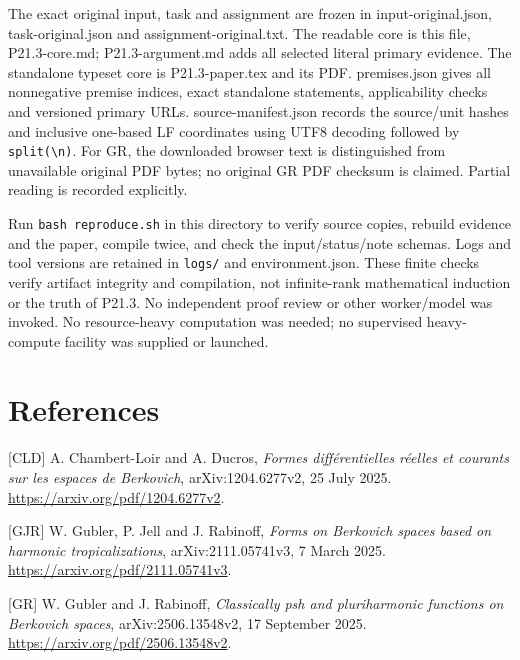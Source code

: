 \documentclass[
  11pt,
]{article}
\begin{document}
The exact original input, task and assignment are frozen in
input-original.json, task-original.json and assignment-original.txt. The
readable core is this file, P21.3-core.md; P21.3-argument.md adds all
selected literal primary evidence. The standalone typeset core is
P21.3-paper.tex and its PDF. premises.json gives all nonnegative premise
indices, exact standalone statements, applicability checks and versioned
primary URLs. source-manifest.json records the source/unit hashes and
inclusive one-based LF coordinates using UTF8 decoding followed by
\texttt{split(\textquotesingle{}\textbackslash{}n\textquotesingle{})}.
For GR, the downloaded browser text is distinguished from unavailable
original PDF bytes; no original GR PDF checksum is claimed. Partial
reading is recorded explicitly.

Run \texttt{bash\ reproduce.sh} in this directory to verify source
copies, rebuild evidence and the paper, compile twice, and check the
input/status/note schemas. Logs and tool versions are retained in
\texttt{logs/} and environment.json. These finite checks verify artifact
integrity and compilation, not infinite-rank mathematical induction or
the truth of P21.3. No independent proof review or other worker/model
was invoked. No resource-heavy computation was needed; no supervised
heavy-compute facility was supplied or launched.

\section{References}\label{references}

{[}CLD{]} A. Chambert-Loir and A. Ducros, \emph{Formes différentielles
réelles et courants sur les espaces de Berkovich}, arXiv:1204.6277v2, 25
July 2025. \url{https://arxiv.org/pdf/1204.6277v2}.

{[}GJR{]} W. Gubler, P. Jell and J. Rabinoff, \emph{Forms on Berkovich
spaces based on harmonic tropicalizations}, arXiv:2111.05741v3, 7 March
2025. \url{https://arxiv.org/pdf/2111.05741v3}.

{[}GR{]} W. Gubler and J. Rabinoff, \emph{Classically psh and
pluriharmonic functions on Berkovich spaces}, arXiv:2506.13548v2, 17
September 2025. \url{https://arxiv.org/pdf/2506.13548v2}.
\end{document}
